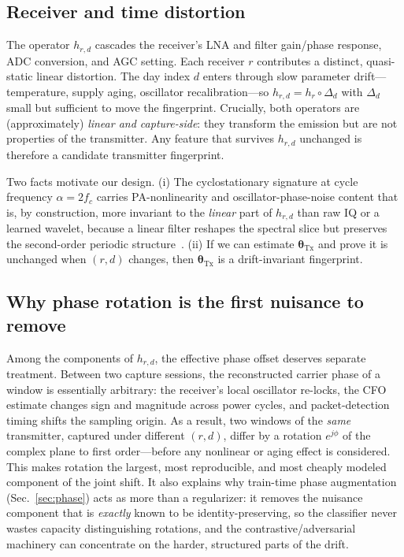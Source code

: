 \documentclass[journal]{IEEEtran}
\newcommand{\tx}{\boldsymbol{\theta}_{\mathrm{Tx}}}
\begin{document}
\subsection{Receiver and time distortion}
The operator $h_{r,d}$ cascades the receiver's LNA and filter gain/phase response, ADC conversion, and AGC setting. Each receiver $r$ contributes a distinct, quasi-static linear distortion. The day index $d$ enters through slow parameter drift---temperature, supply aging, oscillator recalibration---so $h_{r,d} = h_r \circ \Delta_d$ with $\Delta_d$ small but sufficient to move the fingerprint. Crucially, both operators are (approximately) \emph{linear and capture-side}: they transform the emission but are not properties of the transmitter. Any feature that survives $h_{r,d}$ unchanged is therefore a candidate transmitter fingerprint.

Two facts motivate our design. (i) The cyclostationary signature at cycle frequency $\alpha=2f_c$ carries PA-nonlinearity and oscillator-phase-noise content that is, by construction, more invariant to the \emph{linear} part of $h_{r,d}$ than raw IQ or a learned wavelet, because a linear filter reshapes the spectral slice but preserves the second-order periodic structure~\cite{gardner1988}. (ii) If we can estimate $\tx$ and prove it is unchanged when $(r,d)$ changes, then $\tx$ is a drift-invariant fingerprint.

\subsection{Why phase rotation is the first nuisance to remove}
\label{sec:phasetheory}
Among the components of $h_{r,d}$, the effective phase offset deserves separate treatment. Between two capture sessions, the reconstructed carrier phase of a window is essentially arbitrary: the receiver's local oscillator re-locks, the CFO estimate changes sign and magnitude across power cycles, and packet-detection timing shifts the sampling origin. As a result, two windows of the \emph{same} transmitter, captured under different $(r,d)$, differ by a rotation $e^{j\phi}$ of the complex plane to first order---before any nonlinear or aging effect is considered. This makes rotation the largest, most reproducible, and most cheaply modeled component of the joint shift. It also explains why train-time phase augmentation (Sec.~\ref{sec:phase}) acts as more than a regularizer: it removes the nuisance component that is \emph{exactly} known to be identity-preserving, so the classifier never wastes capacity distinguishing rotations, and the contrastive/adversarial machinery can concentrate on the harder, structured parts of the drift.
\end{document}
